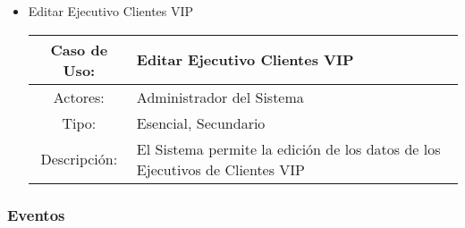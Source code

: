 \begin{itemize}
	\item Editar Ejecutivo Clientes VIP\\
		\begin{tabular}{|c|p{11cm}|}\hline
			Caso de Uso: & Editar Ejecutivo Clientes VIP\\\hline
       			Actores: &Administrador del Sistema\\\hline
			Tipo: & Esencial, Secundario\\\hline
			Descripción: &El Sistema permite la edición de los datos de los Ejecutivos de Clientes VIP\\\hline
		\end{tabular}
\end{itemize}


\subsubsection{Eventos}

